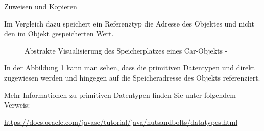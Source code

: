 \documentclass{../tuda-exercise}
\begin{document}
\begin{task}[credit=\stars{0}{3}]{Zuweisen und Kopieren}
\begin{solution}
\begin{note}[title=Information:]
        \br

        Im Vergleich dazu speichert ein Referenztyp die Adresse des Objektes und nicht den im
        Objekt gespeicherten Wert.

        \br

        


        \begin{figure}[H]
          \centering
          \begin{memory}
          \end{memory}
          \caption{Abstrakte Visualisierung des Speicherplatzes eines Car-Objekts -
          }
          \label{fig:V2_Information}
        \end{figure}

        In der Abbildung \ref{fig:V2_Information} kann man sehen, dass die primitiven Datentypen
         und  direkt zugewiesen werden und 
        hingegen auf die Speicheradresse des Objekts referenziert.

        \br

        Mehr Informationen zu primitiven Datentypen finden Sie unter folgendem Verweis:

        \begin{center}
          \url{https://docs.oracle.com/javase/tutorial/java/nutsandbolts/datatypes.html}
        \end{center}
      \end{note}
    \end{solution}
  \end{task}

  \clearpage
\end{document}

